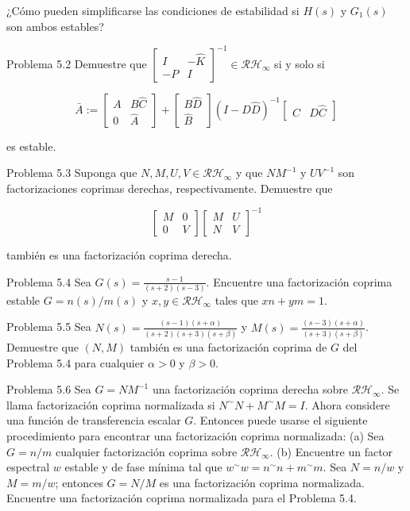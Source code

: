 
¿Cómo pueden simplificarse las condiciones de estabilidad si $H(s)$ y $G_{1}(s)$ son ambos estables?

Problema 5.2 Demuestre que $\left[\begin{array}{cc}I & -\hat{K} \\ -P & I\end{array}\right]^{-1} \in \mathcal{R} \mathcal{H}_{\infty}$ si y solo si

$$
\bar{A}:=\left[\begin{array}{cc}
A & B \hat{C} \\
0 & \hat{A}
\end{array}\right]+\left[\begin{array}{c}
B \hat{D} \\
\hat{B}
\end{array}\right](I-D \hat{D})^{-1}\left[\begin{array}{ll}
C & D \hat{C}
\end{array}\right]
$$

es estable.

Problema 5.3 Suponga que $N, M, U, V \in \mathcal{R} \mathcal{H}_{\infty}$ y que $N M^{-1}$ y $U V^{-1}$ son factorizaciones coprimas derechas, respectivamente. Demuestre que

$$
\left[\begin{array}{cc}
M & 0 \\
0 & V
\end{array}\right]\left[\begin{array}{ll}
M & U \\
N & V
\end{array}\right]^{-1}
$$

también es una factorización coprima derecha.

Problema 5.4 Sea $G(s)=\frac{s-1}{(s+2)(s-3)}$. Encuentre una factorización coprima estable $G=n(s)/m(s)$ y $x, y \in \mathcal{R} \mathcal{H}_{\infty}$ tales que $x n+y m=1$.

Problema 5.5 Sea $N(s)=\frac{(s-1)(s+\alpha)}{(s+2)(s+3)(s+\beta)}$ y $M(s)=\frac{(s-3)(s+\alpha)}{(s+3)(s+\beta)}$. Demuestre que $(N, M)$ también es una factorización coprima de $G$ del Problema 5.4 para cualquier $\alpha>0$ y $\beta>0$.

Problema 5.6 Sea $G=N M^{-1}$ una factorización coprima derecha sobre $\mathcal{R} \mathcal{H}_{\infty}$. Se llama factorización coprima normalizada si $N^{\sim} N+M^{\sim} M=I$. Ahora considere una función de transferencia escalar $G$. Entonces puede usarse el siguiente procedimiento para encontrar una factorización coprima normalizada: (a) Sea $G=n/m$ cualquier factorización coprima sobre $\mathcal{R} \mathcal{H}_{\infty}$. (b) Encuentre un factor espectral $w$ estable y de fase mínima tal que $w^{\sim} w=n^{\sim} n+m^{\sim} m$. Sea $N=n/w$ y $M=m/w$; entonces $G=N/M$ es una factorización coprima normalizada. Encuentre una factorización coprima normalizada para el Problema 5.4.

